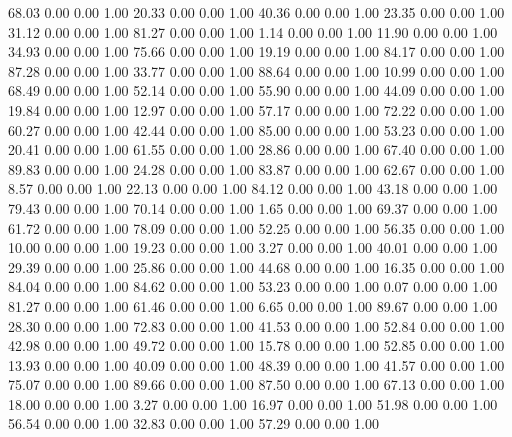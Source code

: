    68.03   0.00   0.00   1.00
   20.33   0.00   0.00   1.00
   40.36   0.00   0.00   1.00
   23.35   0.00   0.00   1.00
   31.12   0.00   0.00   1.00
   81.27   0.00   0.00   1.00
    1.14   0.00   0.00   1.00
   11.90   0.00   0.00   1.00
   34.93   0.00   0.00   1.00
   75.66   0.00   0.00   1.00
   19.19   0.00   0.00   1.00
   84.17   0.00   0.00   1.00
   87.28   0.00   0.00   1.00
   33.77   0.00   0.00   1.00
   88.64   0.00   0.00   1.00
   10.99   0.00   0.00   1.00
   68.49   0.00   0.00   1.00
   52.14   0.00   0.00   1.00
   55.90   0.00   0.00   1.00
   44.09   0.00   0.00   1.00
   19.84   0.00   0.00   1.00
   12.97   0.00   0.00   1.00
   57.17   0.00   0.00   1.00
   72.22   0.00   0.00   1.00
   60.27   0.00   0.00   1.00
   42.44   0.00   0.00   1.00
   85.00   0.00   0.00   1.00
   53.23   0.00   0.00   1.00
   20.41   0.00   0.00   1.00
   61.55   0.00   0.00   1.00
   28.86   0.00   0.00   1.00
   67.40   0.00   0.00   1.00
   89.83   0.00   0.00   1.00
   24.28   0.00   0.00   1.00
   83.87   0.00   0.00   1.00
   62.67   0.00   0.00   1.00
    8.57   0.00   0.00   1.00
   22.13   0.00   0.00   1.00
   84.12   0.00   0.00   1.00
   43.18   0.00   0.00   1.00
   79.43   0.00   0.00   1.00
   70.14   0.00   0.00   1.00
    1.65   0.00   0.00   1.00
   69.37   0.00   0.00   1.00
   61.72   0.00   0.00   1.00
   78.09   0.00   0.00   1.00
   52.25   0.00   0.00   1.00
   56.35   0.00   0.00   1.00
   10.00   0.00   0.00   1.00
   19.23   0.00   0.00   1.00
    3.27   0.00   0.00   1.00
   40.01   0.00   0.00   1.00
   29.39   0.00   0.00   1.00
   25.86   0.00   0.00   1.00
   44.68   0.00   0.00   1.00
   16.35   0.00   0.00   1.00
   84.04   0.00   0.00   1.00
   84.62   0.00   0.00   1.00
   53.23   0.00   0.00   1.00
    0.07   0.00   0.00   1.00
   81.27   0.00   0.00   1.00
   61.46   0.00   0.00   1.00
    6.65   0.00   0.00   1.00
   89.67   0.00   0.00   1.00
   28.30   0.00   0.00   1.00
   72.83   0.00   0.00   1.00
   41.53   0.00   0.00   1.00
   52.84   0.00   0.00   1.00
   42.98   0.00   0.00   1.00
   49.72   0.00   0.00   1.00
   15.78   0.00   0.00   1.00
   52.85   0.00   0.00   1.00
   13.93   0.00   0.00   1.00
   40.09   0.00   0.00   1.00
   48.39   0.00   0.00   1.00
   41.57   0.00   0.00   1.00
   75.07   0.00   0.00   1.00
   89.66   0.00   0.00   1.00
   87.50   0.00   0.00   1.00
   67.13   0.00   0.00   1.00
   18.00   0.00   0.00   1.00
    3.27   0.00   0.00   1.00
   16.97   0.00   0.00   1.00
   51.98   0.00   0.00   1.00
   56.54   0.00   0.00   1.00
   32.83   0.00   0.00   1.00
   57.29   0.00   0.00   1.00
